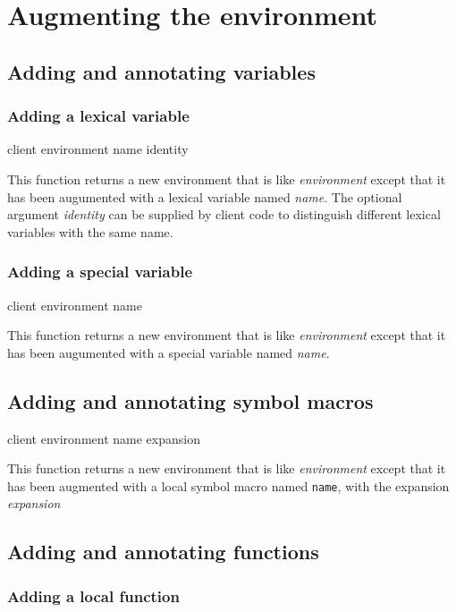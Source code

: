\chapter{Augmenting the environment}

\section{Adding and annotating variables}

\subsection{Adding a lexical variable}

 {client environment name \optional identity}

This function returns a new environment that is like
\textit{environment} except that it has been augumented with a lexical
variable named \textit{name}.  The optional argument \textit{identity}
can be supplied by client code to distinguish different lexical
variables with the same name.

\subsection{Adding a special variable}

 {client environment name}

This function returns a new environment that is like
\textit{environment} except that it has been augumented with a special
variable named \textit{name}.

\section{Adding and annotating symbol macros}

 {client environment name expansion}

This function returns a new environment that is like
\textit{environment} except that it has been augmented with a local
symbol macro named \texttt{name}, with the expansion
\textit{expansion}

\section{Adding and annotating functions}

\subsection{Adding a local function}

